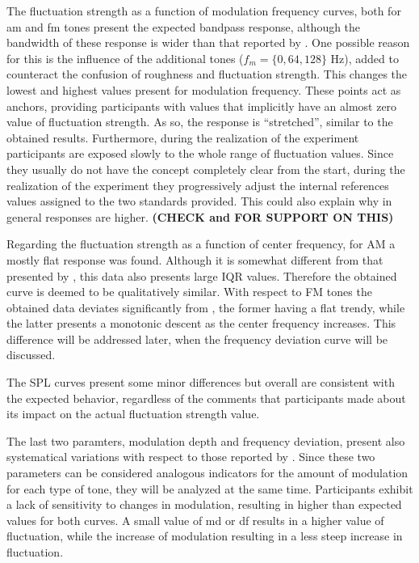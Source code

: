 \documentclass[../main.tex]{subfiles}
\begin{document}
The fluctuation strength as a function of modulation frequency curves, both for
\gls{am} and \gls{fm} tones present the expected bandpass response, although
the bandwidth of these response is wider than that reported by
\citeauthor{Fastl2007Psychoacoustics}. One possible reason for this is the
influence of the additional tones ($f_m = \{0, 64, 128\}$ Hz), added to
counteract the confusion of roughness and fluctuation strength. This changes
the lowest and highest values present for modulation frequency. These points
act as anchors, providing participants with values that implicitly have an
almost zero value of fluctuation strength. As so, the response is ``stretched'',
similar to the obtained results. Furthermore, during the realization of the
experiment participants are exposed slowly to the whole range of fluctuation
values. Since they usually do not have the concept completely clear from the
start, during the realization of the experiment they progressively adjust the
internal references values assigned to the two standards provided. This could
also explain why in general responses are higher. \textbf{(CHECK
\cite{Krantz1972} and \cite{Marley1972} FOR SUPPORT ON THIS)}

Regarding the fluctuation strength as a function of center frequency, for
\gls{AM} a mostly flat response was found. Although it is somewhat different
from that presented by \citeauthor{Fastl2007Psychoacoustics}, this data also
presents large \gls{IQR} values. Therefore the obtained curve is deemed to be
qualitatively similar. With respect to \gls{FM} tones the obtained data
deviates significantly from \citeauthor{Fastl2007Psychoacoustics}, the former
having a flat trendy, while the latter presents a monotonic descent as the
center frequency increases. This difference will be addressed later, when the
frequency deviation curve will be discussed.

The \gls{SPL} curves present some minor differences but overall are consistent
with the expected behavior, regardless of the comments that participants made
about its impact on the actual fluctuation strength value.

The last two paramters, modulation depth and frequency deviation, present also
systematical variations with respect to those reported by
\citeauthor{Fastl2007Psychoacoustics}. Since these two parameters can be
considered analogous indicators for the amount of modulation for each type of
tone, they will be analyzed at the same time. Participants exhibit a lack of
sensitivity to changes in modulation, resulting in higher than expected values
for both curves. A small value of \gls{md} or \gls{df} results in a higher
value of fluctuation, while the increase of modulation resulting in a less
steep increase in fluctuation.
\end{document}
